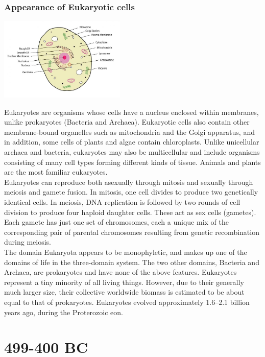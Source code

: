 \documentclass[11pt]{report}
\begin{document}
\section{Appearance of Eukaryotic cells}
\vspace{2mm}\begin{center}\includegraphics[width=6cm]{./img/eukaryoticCell.jpg}\end{center}
Eukaryotes are organisms whose cells have a nucleus enclosed within membranes, unlike prokaryotes (Bacteria and Archaea). Eukaryotic cells also contain other membrane-bound organelles such as mitochondria and the Golgi apparatus, and in addition, some cells of plants and algae contain chloroplasts. Unlike unicellular archaea and bacteria, eukaryotes may also be multicellular and include organisms consisting of many cell types forming different kinds of tissue. Animals and plants are the most familiar eukaryotes.\\
Eukaryotes can reproduce both asexually through mitosis and sexually through meiosis and gamete fusion. In mitosis, one cell divides to produce two genetically identical cells. In meiosis, DNA replication is followed by two rounds of cell division to produce four haploid daughter cells. These act as sex cells (gametes). Each gamete has just one set of chromosomes, each a unique mix of the corresponding pair of parental chromosomes resulting from genetic recombination during meiosis.\\
The domain Eukaryota appears to be monophyletic, and makes up one of the domains of life in the three-domain system. The two other domains, Bacteria and Archaea, are prokaryotes and have none of the above features. Eukaryotes represent a tiny minority of all living things. However, due to their generally much larger size, their collective worldwide biomass is estimated to be about equal to that of prokaryotes. Eukaryotes evolved approximately 1.6–2.1 billion years ago, during the Proterozoic eon.


\part{499-400 BC}
\end{document}
